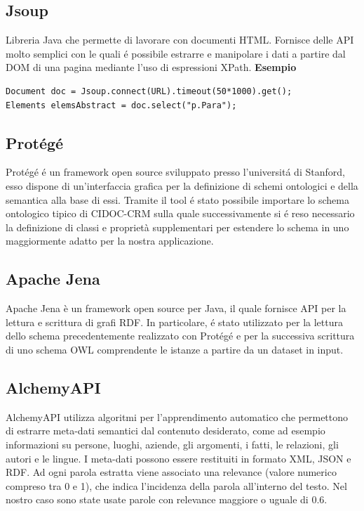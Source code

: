\documentclass[11pt,a4paper]{article}
\begin{document}
\subsection{Jsoup}
Libreria Java che permette di lavorare con documenti HTML. Fornisce delle API molto semplici con le quali \'e possibile estrarre e manipolare i dati a partire dal DOM di una pagina mediante l'uso di espressioni XPath. 
\newline \newline 
\textbf  {Esempio}
\begin{lstlisting}[breaklines=true]
Document doc = Jsoup.connect(URL).timeout(50*1000).get();
Elements elemsAbstract = doc.select("p.Para");
\end{lstlisting} 

\subsection{Prot\'eg\'e}
Prot\'eg\'e \'e un framework open source sviluppato presso l'universit\'a di Stanford, esso dispone di un'interfaccia grafica per la definizione di schemi ontologici e della semantica alla base di essi. Tramite il tool \'e stato possibile importare lo schema ontologico tipico di CIDOC-CRM sulla quale successivamente si \'e reso necessario la definizione di classi e proprietà supplementari per estendere lo schema in uno maggiormente adatto per la nostra applicazione.

\subsection{Apache Jena}
Apache Jena è un framework open source per Java, il quale fornisce API per la lettura e scrittura di grafi RDF. In particolare, \'e stato utilizzato per la lettura dello schema precedentemente realizzato con Prot\'eg\'e e per la successiva scrittura di uno schema OWL comprendente le istanze a partire da un dataset in input.

\subsection{AlchemyAPI}
AlchemyAPI utilizza algoritmi per  l'apprendimento automatico che permettono di  estrarre meta-dati semantici dal contenuto desiderato, come ad esempio informazioni su persone, luoghi, aziende, gli argomenti, i fatti, le relazioni, gli autori e le lingue. I meta-dati possono essere restituiti in formato XML, JSON e RDF. \newline
Ad ogni parola estratta viene associato una relevance (valore numerico compreso tra 0 e 1), che indica l'incidenza della parola all'interno del testo.
Nel nostro caso sono state usate parole con relevance maggiore o uguale di 0.6. 
\end{document}
